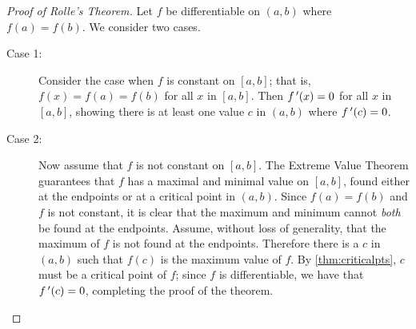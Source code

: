 \begin{proof}[Proof of Rolle's Theorem]
Let $f$ be differentiable on $(a,b)$ where $f(a)=f(b)$. We consider two cases. 

\begin{description}%
\item[Case 1:] Consider the case when $f$ is constant on $[a,b]$; that is, $f(x) = f(a) = f(b)$ for all $x$ in $[a,b]$. Then $f\,'(x) = 0$ for all $x$ in $[a,b]$, showing there is at least one value $c$ in $(a,b)$ where $f\,'(c)=0$.

\item[Case 2:] Now assume that $f$ is not constant on $[a,b]$. The Extreme Value Theorem guarantees that $f$ has a maximal and minimal value on $[a,b]$, found either at the endpoints or at a critical point in $(a,b)$. Since $f(a)=f(b)$ and $f$ is not constant, it is clear that the maximum and minimum cannot \emph{both} be found at the endpoints. Assume, without loss of generality, that the maximum of $f$ is not found at the endpoints. Therefore there is a $c$ in $(a,b)$ such that $f(c)$ is the maximum value of $f$. By \autoref{thm:criticalpts}, $c$ must be a critical point of $f$; since $f$ is differentiable, we have that $f\,'(c) = 0$, completing the proof of the theorem.\qedhere
\end{description}
\end{proof}



